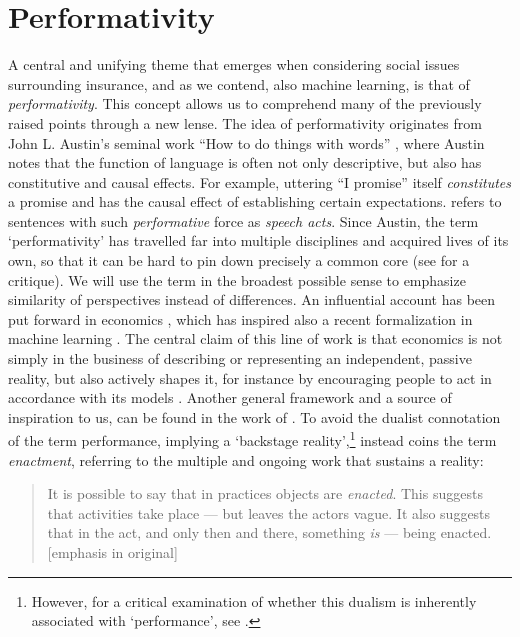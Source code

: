 \documentclass[11pt]{article} %
\begin{document}
\section{Performativity}
\label{sec:performativity}
A central and unifying theme that emerges when considering social issues surrounding insurance, and as we contend, also machine learning, is that of \textit{performativity}. This concept allows us to comprehend many of the previously raised points through a new lense. The idea of performativity originates from John L.\@\xspace Austin's seminal work ``How to do things with words'' \citep{austin1962how}, where Austin notes that the function of language is often not only descriptive, but also has constitutive and causal effects. For example, uttering ``I promise'' itself \textit{constitutes} a promise and has the causal effect of establishing certain expectations. \citet{austin1962how} refers to sentences with such \textit{performative} force as \textit{speech acts}. Since Austin, the term `performativity' has travelled far into multiple disciplines and acquired lives of its own, so that it can be hard to pin down precisely a common core (see \citep{maki2013performativity} for a critique). We will use the term in the broadest possible sense to emphasize similarity of perspectives instead of differences.
An influential account has been put forward in economics \citep{callon1998laws,mackenzie2007economists,mackenzie2008engine}, which has inspired also a recent formalization in machine learning \citep{perdomo2020performative,hardt2022performative}. The central claim of this line of work is that economics is not simply in the business of describing or representing an independent, passive reality, but also actively shapes it, for instance by encouraging people to act in accordance with its models \citep{boldyrev2016enacting}. Another general framework and a source of inspiration to us, can be found in the work of \citet{mol2002body}. To avoid the dualist connotation of the term performance, implying a `backstage reality',\footnote{However, for a critical examination of whether this dualism is inherently associated with `performance', see \citep{hafermalz2016enactment}.} \citet{mol2002body} instead coins the term \textit{enactment}, referring to the multiple and ongoing work that sustains a reality:
\begin{quote}
It is possible to say that in practices objects are \textit{enacted}. This suggests that activities take place --- but
leaves the actors vague. It also suggests that in the act, and only then and there,
something \textit{is} --- being enacted. [emphasis in original]
\end{quote}
\end{document}
